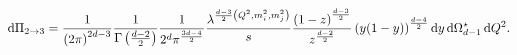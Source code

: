 \documentclass[../main.tex]{subfiles}
\begin{document}
            \begin{equation}
                \mathrm{d}\Pi_{2\to 3} = \frac{1}{\left(2\pi\right)^{2d-3}} \frac{1}{\Gamma\left(\frac{d-2}{2}\right)} \frac{1}{2^d \pi^{\frac{3d-4}{2}}} \frac{\lambda^{\frac{d-3}{2}\left(Q^2, m_i^2, m_j^2\right)}}{s}\frac{\left(1-z\right)^{\frac{d-3}{2}}}{z^{\frac{d-2}{2}}} \left(y(1-y)\right)^{\frac{d-4}{2}} \mathrm{d}y\, \mathrm{d}\Omega_{d-1}^\star\, \mathrm{d}Q^2.
            \end{equation}


\end{document}
